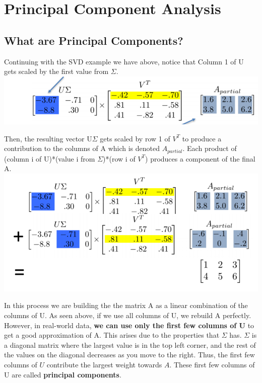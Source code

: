\documentclass{article}
\begin{document}
\section{Principal Component Analysis}

\subsection{What are Principal Components?}
Continuing with the SVD example we have above, notice that Column 1 of U gets scaled by the first value from $\Sigma$.\\

\includegraphics[scale = 0.5]{Usig}

Then, the resulting vector U$\Sigma$ gets scaled by row 1 of $V^T$ to produce a contribution to the columns of A which is denoted $A_{partial}$. Each product of (column i of U)*(value i from $\Sigma$)*(row i of $V^T$) produces a component of the final A.\\

\includegraphics[scale = 0.5]{full_pca}

In this process we are building the the matrix A as a linear combination of the columns of U. As seen above, if we use all columns of U, we rebuild A perfectly. However, in real-world data, \textbf{we can use only the first few columns of U} to get a good approximation of A. This arises due to the properties that $\Sigma$ has. $\Sigma$ is a diagonal matrix where the largest value is in the top left corner, and the rest of the values on the diagonal decreases as you move to the right. Thus, the first few columns of $U$ contribute the largest weight towards $A$. These first few columns of U are called \textbf{principal components}.\\
\end{document}
